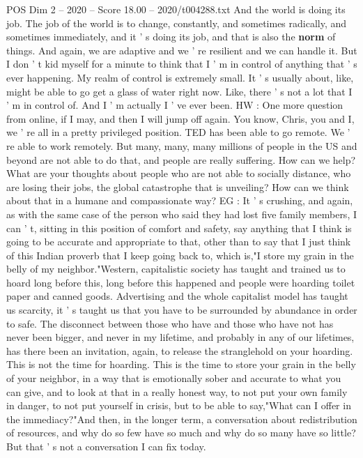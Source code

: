 \begin{textsample}{POS Dim 2 – 2020 – Score 18.00 – 2020/t004288.txt}
And the world is doing its job.
The job of the world is to change, constantly, and sometimes radically, and sometimes immediately, and it ' s doing its job, and that is also the \textbf{norm} of things.
And again, we are adaptive and we ' re resilient and we can handle it.
But I don ' t kid myself for a minute to think that I ' m in control of anything that ' s ever happening.
My realm of control is extremely small.
It ' s usually about, like, might be able to go get a glass of water right now.
Like, there ' s not a lot that I ' m in control of.
And I ' m actually I ' ve ever been.
HW : One more question from online, if I may, and then I will jump off again.
You know, Chris, you and I, we ' re all in a pretty privileged position.
TED has been able to go remote.
We ' re able to work remotely.
But many, many, many millions of people in the US and beyond are not able to do that, and people are really suffering.
How can we help?
What are your thoughts about people who are not able to socially distance, who are losing their jobs, the global catastrophe that is unveiling?
How can we think about that in a humane and compassionate way?
EG : It ' s crushing, and again, as with the same case of the person who said they had lost five family members, I can ' t, sitting in this position of comfort and safety, say anything that I think is going to be accurate and appropriate to that, other than to say that I just think of this Indian proverb that I keep going back to, which is,"I store my grain in the belly of my neighbor."Western, capitalistic society has taught and trained us to hoard long before this, long before this happened and people were hoarding toilet paper and canned goods.
Advertising and the whole capitalist model has taught us scarcity, it ' s taught us that you have to be surrounded by abundance in order to safe.
The disconnect between those who have and those who have not has never been bigger, and never in my lifetime, and probably in any of our lifetimes, has there been an invitation, again, to release the stranglehold on your hoarding.
This is not the time for hoarding.
This is the time to store your grain in the belly of your neighbor, in a way that is emotionally sober and accurate to what you can give, and to look at that in a really honest way, to not put your own family in danger, to not put yourself in crisis, but to be able to say,"What can I offer in the immediacy?"And then, in the longer term, a conversation about redistribution of resources, and why do so few have so much and why do so many have so little?
But that ' s not a conversation I can fix today.

\end{textsample}
